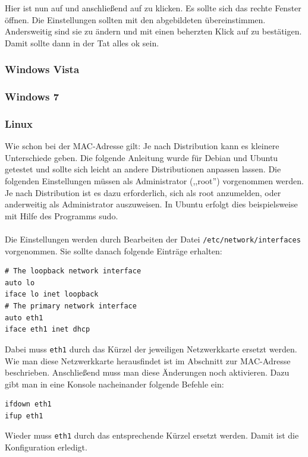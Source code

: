 Hier ist nun auf  und anschließend
auf  zu klicken. Es sollte sich das rechte Fenster
öffnen.
Die Einstellungen sollten mit den abgebildeten
übereinstimmen. Andersweitig sind sie zu ändern und mit einen
beherzten Klick auf  zu bestätigen. Damit sollte dann in der
Tat alles ok sein.
\subsubsection{Windows Vista}

\subsubsection{Windows 7}

\subsubsection{Linux}
\small{Wie schon bei der MAC-Adresse gilt: Je nach Distribution kann es kleinere Unterschiede
geben. Die folgende Anleitung wurde für Debian und Ubuntu getestet und
sollte sich leicht an andere Distributionen anpassen lassen.}
Die folgenden Einstellungen müssen als Administrator (,,root'') vorgenommen
werden. Je nach Distribution ist es dazu erforderlich, sich als root
anzumelden, oder anderweitig als Administrator auszuweisen. In Ubuntu
erfolgt dies beispielsweise mit Hilfe des Programms sudo.\\\\
Die Einstellungen werden durch Bearbeiten der Datei
\texttt{/etc/network/interfaces} vorgenommen. Sie sollte danach
folgende Einträge erhalten:
\begin{verbatim}
# The loopback network interface
auto lo 
iface lo inet loopback
# The primary network interface
auto eth1
iface eth1 inet dhcp 
\end{verbatim}
Dabei muss \texttt{eth1} durch das Kürzel der jeweiligen Netzwerkkarte
ersetzt werden. Wie man diese Netzwerkkarte herausfindet ist im
Abschnitt zur MAC-Adresse beschrieben. Anschließend muss man diese
Änderungen noch aktivieren. Dazu gibt man in eine Konsole nacheinander
folgende Befehle ein:
\begin{verbatim}
ifdown eth1
ifup eth1
\end{verbatim}
Wieder muss \texttt{eth1} durch das entsprechende Kürzel ersetzt
werden. Damit ist die Konfiguration erledigt.

